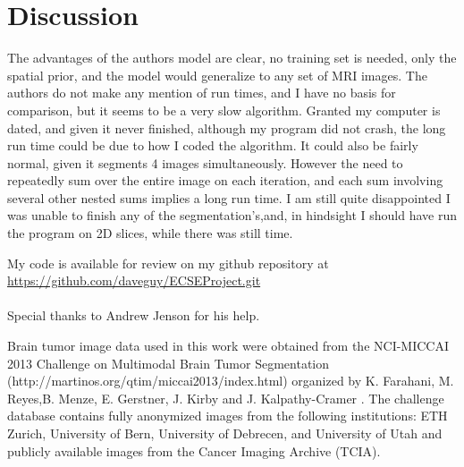 \documentclass[10pt,twocolumn,letterpaper]{article}
\begin{document}
\section{Discussion}
The advantages of the authors model are clear, no training set is needed, only the spatial prior, and the model would generalize to any set of MRI images. The authors do not make any mention of run times, and I have no basis for comparison, but it seems to be a very slow algorithm. Granted my computer is dated, and given it never finished, although my program did not crash, the long run time could be due to how I coded the algorithm. It could also be fairly normal, given it segments 4 images simultaneously. However the need to repeatedly sum over the entire image on each iteration, and each sum involving several other nested sums implies a long run time. I am still quite disappointed I was unable to finish any of the segmentation's,and, in hindsight I should have run the program on 2D slices, while there was still time. 

My code is available for review on my github repository at \url{https://github.com/daveguy/ECSEProject.git}
\\\\
Special thanks to Andrew Jenson for his help.



{\small


Brain tumor image data used in this work were obtained from the NCI-MICCAI 2013 Challenge on Multimodal Brain Tumor Segmentation (http://martinos.org/qtim/miccai2013/index.html) organized by K. Farahani, M. Reyes,B. Menze, E. Gerstner, J. Kirby and J. Kalpathy-Cramer . The challenge database contains fully anonymized images from the following institutions: ETH Zurich, University of Bern, University of Debrecen, and University of Utah and publicly available images from the Cancer Imaging Archive (TCIA).
}
\end{document}

